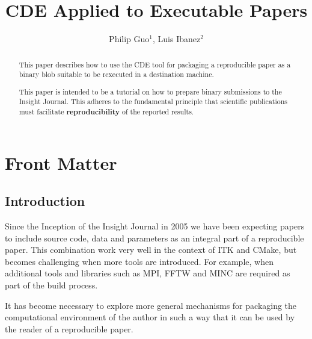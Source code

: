 \documentclass{InsightArticle}
\title{CDE Applied to Executable Papers}
\author{Philip Guo$^{1}$, Luis Ibanez$^{2}$}
\newcommand{\IJhandlerIDnumber}{3261}
\begin{document}
%
%
\IJhandlefooter{\IJhandlerIDnumber}


\ifpdf
\else
\fi


\maketitle


\ifhtml
\chapter*{Front Matter\label{front}}
\fi


\begin{abstract}
\noindent
This paper describes how to use the CDE tool for packaging a reproducible paper
as a binary blob suitable to be rexecuted in a destination machine.

This paper is intended to be a tutorial on how to prepare binary submissions to
the Insight Journal. This adheres to the fundamental principle that scientific
publications must facilitate \textbf{reproducibility} of the reported results.
\end{abstract}

\tableofcontents

\section{Introduction}

Since the Inception of the Insight Journal in 2005 we have been expecting
papers to include source code, data and parameters as an integral part of a
reproducible paper. This combination work very well in the context of ITK
and CMake, but becomes challenging when more tools are introduced. For example,
when additional tools and libraries such as MPI, FFTW and MINC are required as
part of the build process.

It has become necessary to explore more general mechanisms for packaging the
computational environment of the author in such a way that it can be used by
the reader of a reproducible paper.
\end{document}
